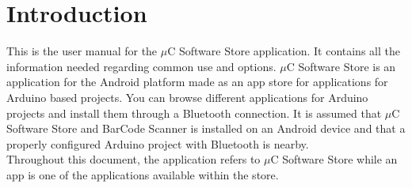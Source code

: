 \chapter{Introduction}
This is the user manual for the $\mu$C Software Store application. It contains all the information needed regarding common use and options. $\mu$C Software Store is an application for the Android platform made as an app store for applications for Arduino based projects. You can browse different applications for Arduino projects and install them through a Bluetooth connection. It is assumed that $\mu$C Software Store and BarCode Scanner is installed on an Android device and that a properly configured Arduino project with Bluetooth is nearby.\\
\newline
Throughout this document, the application refers to $\mu$C Software Store while an app is one of the applications available within the store.

